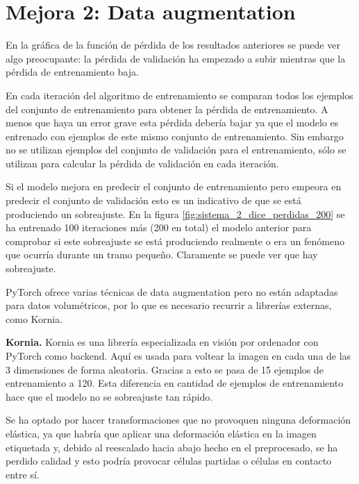 \chapter{Mejora 2: Data augmentation}\label{data_augmentation}

En la gráfica de la función de pérdida de los resultados anteriores se puede ver algo preocupante: la pérdida de validación ha empezado a subir mientras que la pérdida de entrenamiento baja.

En cada iteración del algoritmo de entrenamiento se comparan todos los ejemplos del conjunto de entrenamiento para obtener la pérdida de entrenamiento. A menos que haya un error grave esta pérdida debería bajar ya que el modelo es entrenado con ejemplos de este mismo conjunto de entrenamiento. Sin embargo no se utilizan ejemplos del conjunto de validación para el entrenamiento, sólo se utilizan para calcular la pérdida de validación en cada iteración.

Si el modelo mejora en predecir el conjunto de entrenamiento pero empeora en predecir el conjunto de validación esto es un indicativo de que se está produciendo un sobreajuste. En la figura \ref{fig:sistema_2_dice_perdidas_200} se ha entrenado 100 iteraciones más (200 en total) el modelo anterior para comprobar si este sobreajuste se está produciendo realmente o era un fenómeno que ocurría durante un tramo pequeño. Claramente se puede ver que hay sobreajuste.


PyTorch ofrece varias técnicas de data augmentation pero no están adaptadas para datos volumétricos, por lo que es necesario recurrir a librerías externas, como Kornia.

\textbf{Kornia.} Kornia \cite{ERiba2020} es una librería especializada en visión por ordenador con PyTorch como backend. Aquí es usada para voltear la imagen en cada una de las 3 dimensiones de forma aleatoria. Gracias a esto se pasa de 15 ejemplos de entrenamiento a 120. Esta diferencia en cantidad de ejemplos de entrenamiento hace que el modelo no se sobreajuste tan rápido.

Se ha optado por hacer transformaciones que no provoquen ninguna deformación elástica, ya que habría que aplicar una deformación elástica en la imagen etiquetada y, debido al reescalado hacia abajo hecho en el preprocesado, se ha perdido calidad y esto podría provocar células partidas o células en contacto entre sí.

